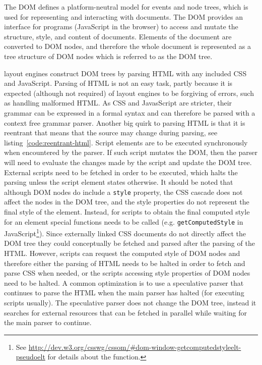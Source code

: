 \documentclass[a4paper,11pt]{kth-mag}
\newcommand{\code}[1]{\texttt{#1}}
\begin{document}
        The \gls{DOM} defines a platform-neutral model for events and node trees, which is used for representing and interacting with \glspl{document}.
        The \gls{DOM} provides an interface for programs (\gls{JavaScript} in the \gls{browser}) to access and mutate the structure, style, and content of \glspl{document}.
        Elements of the \gls{document} are converted to \gls{DOM} nodes, and therefore the whole \gls{document} is represented as a tree structure of \gls{DOM} nodes which is referred to as the \gls{DOM} tree.

        \Glspl{layout engine} construct \gls{DOM} trees by parsing \gls{HTML} with any included \gls{CSS} and \gls{JavaScript}.
        Parsing of \gls{HTML} is not an easy task, partly because it is expected (although not required) of layout engines to be forgiving of errors, such as handling malformed \gls{HTML}.
        As \gls{CSS} and JavasScript are stricter, their grammar can be expressed in a formal syntax and can therefore be parsed with a context free grammar parser.
        Another big quirk to parsing \gls{HTML} is that it is reentrant that means that the source may change during parsing, see listing~\ref{code:reentrant-html}.
        Script \glspl{element} are to be executed synchronously when encountered by the parser.
        If such script mutates the \gls{DOM}, then the parser will need to evaluate the changes made by the script and update the \gls{DOM} tree.
        External scripts need to be fetched in order to be executed, which halts the parsing unless the script \gls{element} states otherwise.
        It should be noted that although \gls{DOM} nodes do include a \code{style} property, the \gls{CSS} cascade does not affect the nodes in the \gls{DOM} tree, and the style properties do not represent the final style of the \gls{element}.
        Instead, for scripts to obtain the final computed style for an \gls{element} special functions needs to be called (e.g. \code{getComputedStyle} in \gls{JavaScript}\footnote{See \url{http://dev.w3.org/csswg/cssom/\#dom-window-getcomputedstyleelt-pseudoelt} for details about the function.}).
        Since externally linked \gls{CSS} \glspl{document} do not directly affect the \gls{DOM} tree they could conceptually be fetched and parsed after the parsing of the \gls{HTML}.
        However, scripts can request the computed style of \gls{DOM} nodes and therefore either the parsing of \gls{HTML} needs to be halted in order to fetch and parse \gls{CSS} when needed, or the scripts accessing style properties of \gls{DOM} nodes need to be halted.
        A common optimization is to use a speculative parser that continues to parse the \gls{HTML} when the main parser has halted (for executing scripts usually).
        The speculative parser does not change the \gls{DOM} tree, instead it searches for external resources that can be fetched in parallel while waiting for the main parser to continue.
\end{document}
